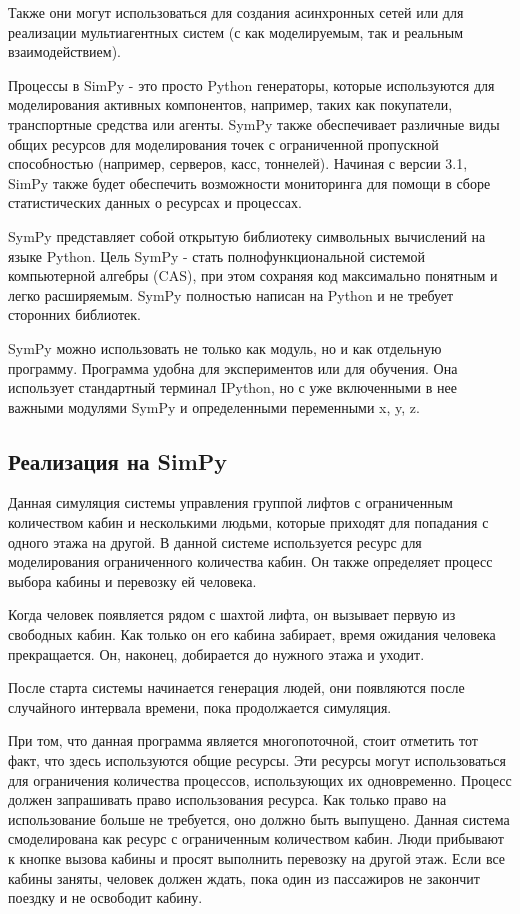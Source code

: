 Также они могут использоваться для создания асинхронных сетей или для реализации мультиагентных систем (с как моделируемым, так и реальным взаимодействием).

Процессы в SimPy - это просто Python генераторы, которые используются для моделирования активных компонентов, например, таких как покупатели, транспортные средства или агенты. SymPy также обеспечивает различные виды общих ресурсов для моделирования точек с ограниченной пропускной способностью (например, серверов, касс, тоннелей). Начиная с версии 3.1, SimPy также будет обеспечить возможности мониторинга для помощи в сборе статистических данных о ресурсах и процессах. 

SymPy представляет собой открытую библиотеку символьных вычислений на языке Python. Цель SymPy - стать полнофункциональной системой компьютерной алгебры (CAS), при этом сохраняя код максимально понятным и легко расширяемым. SymPy полностью написан на Python и не требует сторонних библиотек.

SymPy можно использовать не только как модуль, но и как отдельную программу. Программа удобна для экспериментов или для обучения. Она использует стандартный терминал IPython, но с уже включенными в нее важными модулями SymPy и определенными переменными x, y, z.

\subsection{Реализация на SimPy}

	Данная симуляция системы управления группой лифтов с ограниченным количеством кабин и несколькими людьми,
		которые приходят для попадания с одного этажа на другой.
		В данной системе используется ресурс для моделирования ограниченного количества кабин.
		Он также определяет процесс выбора кабины и перевозку ей человека.

	Когда человек появляется рядом с шахтой лифта, он вызывает первую из свободных кабин.
		Как только он его кабина забирает, время ожидания человека прекращается.
		Он, наконец, добирается до нужного этажа и уходит.

	После старта системы начинается генерация людей, они появляются после случайного интервала времени,
	пока продолжается симуляция.


	При том, что данная программа является многопоточной, стоит отметить тот факт, что здесь используются общие ресурсы.
		Эти ресурсы могут использоваться для ограничения количества процессов, использующих их одновременно.
		Процесс должен запрашивать право использования ресурса. Как только право на использование больше не требуется,
		оно должно быть выпущено. Данная система смоделирована как ресурс с ограниченным количеством кабин.
		Люди прибывают к кнопке вызова кабины и просят выполнить перевозку на другой этаж.
		Если все кабины заняты, человек должен ждать, пока один из пассажиров не закончит поездку и не освободит кабину.

